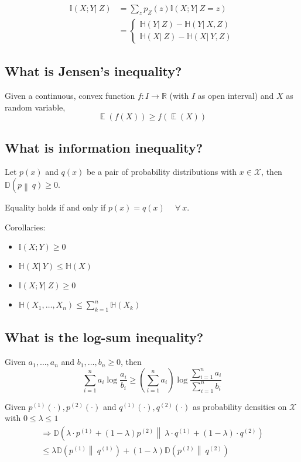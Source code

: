 \documentclass[a4paper]{article}
\newcommand\op[2][P]{\mathbb{#1}\left(#2\right)}
\newcommand\cond[3][P]{\mathbb{#1}\left(#2 \left|\:#3\right)\right.}
\newcommand\kld[3][D]{\mathbb{#1}\left(#2 \left\|\:#3\right)\right.}
\newcommand\fall{\:\forall\:}
\DeclareMathOperator{\Ex}{\mathbb{E}}
\theoremstyle{definition}
\begin{document}
\begin{align*}
  \cond[I]{X;Y}{Z} &= \sum_z p_Z(z) \cond[I]{X;Y}{Z=z} \\
    &= \begin{cases}
      \cond[H]YZ - \cond[H]Y{X,Z} \\
      \cond[H]XZ - \cond[H]X{Y,Z}
    \end{cases}
\end{align*}

\subsection{What is Jensen's inequality?}
%
Given a continuous, convex function $f: I \rightarrow \mathbb{R}$ (with $I$ as open interval) and $X$ as random variable,
\[  \Ex(f(X)) \geq f(\Ex(X))  \]

\subsection{What is information inequality?}

Let $p(x)$ and $q(x)$ be a pair of probability distributions with $x \in \mathcal{X}$, then $\kld{p}{q} \geq 0$.

Equality holds if and only if $p(x) = q(x) \quad\fall x$.

Corollaries:
\begin{itemize}
  \item $\op[I]{X;Y} \geq 0$
  \item $\cond[H]XY \leq \op[H]{X}$
  \item $\cond[I]{X;Y}{Z} \geq 0$
  \item $\op[H]{X_1, \dotsc, X_n} \leq \sum_{k=1}^n \op[H]{X_k}$
\end{itemize}

\subsection{What is the log-sum inequality?}

Given $a_1, \dotsc, a_n$ and $b_1, \dotsc, b_n \geq 0$, then
\[
  \sum_{i=1}^n a_i \log{\frac{a_i}{b_i}}
    \geq \left(\sum_{i=1}^n a_i\right) \log{\frac{\sum_{i=1}^n a_i}{\sum_{i=1}^n b_i}}
\]

Given $p^{(1)}(\cdot), p^{(2)}(\cdot)$ and $q^{(1)}(\cdot), q^{(2)}(\cdot)$
as probability densities on $\mathcal{X}$ with $0 \leq \lambda \leq 1$
\begin{multline*}
  \Rightarrow
    \kld{\lambda \cdot p^{(1)} + (1 - \lambda) p^{(2)}}%
    {\lambda \cdot q^{(1)} + (1 - \lambda) \cdot q^{(2)}} \\
  \leq
    \lambda \kld{p^{(1)}}{q^{(1)}} +
    (1 - \lambda) \kld{p^{(2)}}{q^{(2)}}
\end{multline*}
\end{document}
